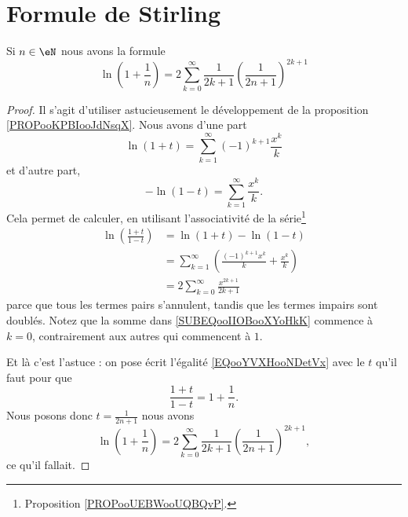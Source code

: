 \section{Formule de Stirling}

\begin{lemma}     \label{LEMooDXJOooOGFcIv}
    Si \( n\in \eN\) nous avons la formule
    \begin{equation}
        \ln(1+\frac{1}{ n })=2\sum_{k=0}^{\infty} \frac{1}{ 2k+1 } \left( \frac{1}{ 2n+1 } \right)^{2k+1}
    \end{equation}
\end{lemma}

\begin{proof}
    Il s'agit d'utiliser astucieusement le développement de la proposition \ref{PROPooKPBIooJdNsqX}. Nous avons d'une part
    \begin{equation}
        \ln(1+t)=\sum_{k=1}^{\infty}(-1)^{k+1}\frac{ x^k }{ k }
    \end{equation}
    et d'autre part,
    \begin{equation}
        -\ln(1-t)=\sum_{k=1}^{\infty}\frac{ x^k }{ k }.
    \end{equation}
    Cela permet de calculer, en utilisant l'associativité de la série\footnote{Proposition \ref{PROPooUEBWooUQBQvP}.}
    \begin{subequations}\label{EQooYVXHooNDetVx}
        \begin{align} 
            \ln\left( \frac{ 1+t }{ 1-t } \right)&=\ln(1+t)-\ln(1-t)\\
            &=\sum_{k=1}^{\infty}\left( \frac{ (-1)^{k+1}x^k }{ k }+\frac{ x^k }{ k } \right)\\
            &=2\sum_{k=0}^{\infty}\frac{ x^{2k+1} }{ 2k+1 }     \label{SUBEQooIIOBooXYoHkK}
        \end{align}
    \end{subequations}
    parce que tous les termes pairs s'annulent, tandis que les termes impairs sont doublés. Notez que la somme dans \eqref{SUBEQooIIOBooXYoHkK} commence à \( k=0\), contrairement aux autres qui commencent à \( 1\).
   
    Et là c'est l'astuce : on pose écrit l'égalité \eqref{EQooYVXHooNDetVx} avec le \( t\) qu'il faut pour que
    \begin{equation}
        \frac{ 1+t }{ 1-t }=1+\frac{1}{ n }.
    \end{equation}
    Nous posons donc \( t=\frac{1}{ 2n+1 }\) nous avons
    \begin{equation}
        \ln\left( 1+\frac{1}{ n } \right)=2\sum_{k=0}^{\infty}  \frac{1}{ 2k+1 } \left( \frac{1}{ 2n+1 } \right)^{2k+1},
    \end{equation}
    ce qu'il fallait.
\end{proof}


